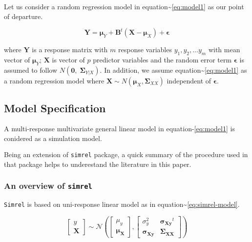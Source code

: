 \documentclass[12pt,A4paper,authoryear]{elsarticle} %
\begin{document}
Let us consider a random regression model in
equation\textasciitilde{}\eqref{eq:model1} as our point of departure.

\begin{equation}
  \mathbf{Y} = \boldsymbol{\mu}_Y + \mathbf{B}^t (\mathbf{X} - \boldsymbol{\mu}_X) + \boldsymbol{\epsilon}
  \label{eq:model1}
\end{equation}

where \(\mathbf{Y}\) is a response matrix with \(m\) response variables
\(y_1, y_2, \ldots y_m\) with mean vector of \(\boldsymbol{\mu}_Y\);
\(\mathbf{X}\) is vector of \(p\) predictor variables and the random
error term \(\boldsymbol{\epsilon}\) is assumed to follow
\(N(\boldsymbol{0},\; \boldsymbol{\Sigma}_{Y|X})\). In addition, we
assume equation\textasciitilde{}\eqref{eq:model1} as a random regression
model where
\(\mathbf{X} \sim N\left(\boldsymbol{\mu}_X, \boldsymbol{\Sigma}_{XX}\right)\)
independent of \(\boldsymbol{\epsilon}\).

\subsection{Model Specification}\label{model-specification}

A multi-response multivariate general linear model in
equation-\eqref{eq:model1} is conidered as a simulation model.

Being an extension of \texttt{simrel} package, a quick summary of the
procedure used in that package helps to underestand the literature in
this paper.

\subsubsection{\texorpdfstring{An overview of
\texttt{simrel}}{An overview of simrel}}\label{an-overview-of-simrel}

\texttt{Simrel} is based on uni-response linear model as in
equation\textasciitilde{}\eqref{eq:simrel-model}.

\begin{equation}
\label{eq:simrel-model}
  \begin{bmatrix}
    y \\ \mathbf{X}
  \end{bmatrix} \sim
  \mathcal{N}\left(
    \begin{bmatrix}
      \mu_y \\ \boldsymbol{\mu_X}
    \end{bmatrix},
    \begin{bmatrix}
      \sigma_y^2               & \boldsymbol{\sigma_{Xy}}^t \\
      \boldsymbol{\sigma_{Xy}} & \boldsymbol{\Sigma_{XX}}
    \end{bmatrix}
  \right)
\end{equation}
\end{document}

